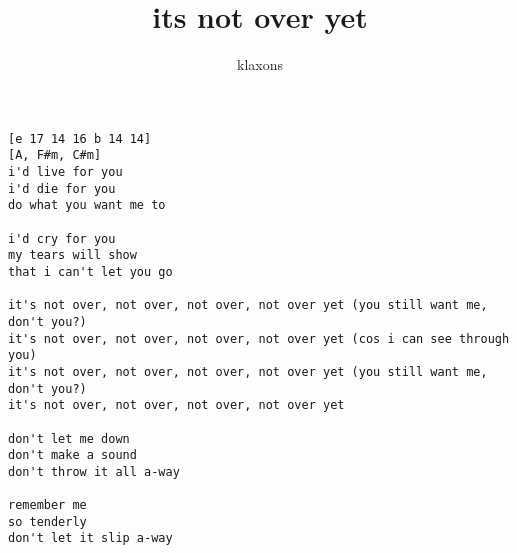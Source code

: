 \author{klaxons}
\title{its not over yet}
\maketitle
\begin{verbatim}
[e 17 14 16 b 14 14]
[A, F#m, C#m]
i'd live for you
i'd die for you
do what you want me to

i'd cry for you
my tears will show
that i can't let you go

it's not over, not over, not over, not over yet (you still want me, don't you?)   
it's not over, not over, not over, not over yet (cos i can see through you)
it's not over, not over, not over, not over yet (you still want me, don't you?)   
it's not over, not over, not over, not over yet

don't let me down 
don't make a sound
don't throw it all a-way

remember me
so tenderly
don't let it slip a-way 
\end{verbatim}
